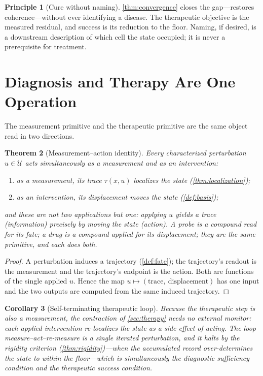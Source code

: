 \documentclass[11pt,a4paper]{article}
\theoremstyle{thmstyle}
\newtheorem{theorem}{Theorem}[section]
\newtheorem{corollary}[theorem]{Corollary}
\theoremstyle{definition}
\newtheorem{principle}[theorem]{Principle}
\theoremstyle{remark}
\newcommand{\st}{x}                     %
\newcommand{\trace}{\tau}               %
\newcommand{\intv}{u}                   %
\begin{document}
\begin{principle}[Cure without naming]
\label{prin:cure}
\cref{thm:convergence} closes the gap---restores coherence---without ever
identifying a disease. The therapeutic objective is the measured residual,
and success is its reduction to the floor. Naming, if desired, is a
downstream description of which cell the state occupied; it is never a
prerequisite for treatment.
\end{principle}

\section{Diagnosis and Therapy Are One Operation}
\label{sec:unity}

The measurement primitive and the therapeutic primitive are the same
object read in two directions.

\begin{theorem}[Measurement--action identity]
\label{thm:unity}
Every characterized perturbation $\intv\in\mathcal{U}$ acts simultaneously
as a measurement and as an intervention:
\begin{enumerate}[label=\textup{(\roman*)},leftmargin=2.2em,itemsep=2pt]
\item as a \emph{measurement}, its trace $\trace(\st,\intv)$ localizes the
state (\cref{thm:localization});
\item as an \emph{intervention}, its displacement moves the state
(\cref{def:basis});
\end{enumerate}
and these are not two applications but one: applying $\intv$ yields a trace
(information) precisely by moving the state (action). A probe is a compound
read for its fate; a drug is a compound applied for its displacement; they
are the same primitive, and each does both.
\end{theorem}

\begin{proof}
A perturbation induces a trajectory (\cref{def:fate}); the trajectory's
readout is the measurement and the trajectory's endpoint is the action.
Both are functions of the single applied $\intv$. Hence the map
$\intv\mapsto(\text{trace},\ \text{displacement})$ has one input and the
two outputs are computed from the same induced trajectory.
\end{proof}

\begin{corollary}[Self-terminating therapeutic loop]
\label{cor:loop}
Because the therapeutic step is also a measurement, the contraction of
\cref{sec:therapy} needs no external monitor: each applied intervention
re-localizes the state as a side effect of acting. The loop
measure--act--re-measure is a single iterated perturbation, and it halts by
the rigidity criterion (\cref{thm:rigidity})---when the accumulated record
over-determines the state to within the floor---which is simultaneously the
diagnostic sufficiency condition and the therapeutic success condition.
\end{corollary}
\end{document}
